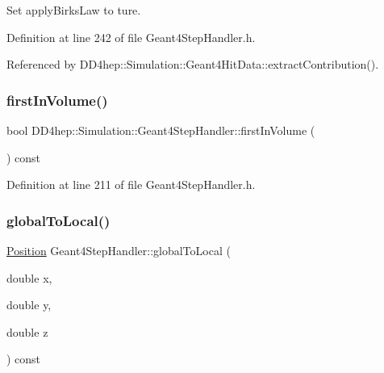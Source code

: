 Set apply\+Birks\+Law to ture. 



Definition at line 242 of file Geant4\+Step\+Handler.\+h.



Referenced by D\+D4hep\+::\+Simulation\+::\+Geant4\+Hit\+Data\+::extract\+Contribution().

\hypertarget{class_d_d4hep_1_1_simulation_1_1_geant4_step_handler_a96df262594297b7030eaac7ed154c622}{}\label{class_d_d4hep_1_1_simulation_1_1_geant4_step_handler_a96df262594297b7030eaac7ed154c622} 
\subsubsection{\texorpdfstring{first\+In\+Volume()}{firstInVolume()}}
{\footnotesize\ttfamily bool D\+D4hep\+::\+Simulation\+::\+Geant4\+Step\+Handler\+::first\+In\+Volume (\begin{DoxyParamCaption}{ }\end{DoxyParamCaption}) const\hspace{0.3cm}{\ttfamily [inline]}}



Definition at line 211 of file Geant4\+Step\+Handler.\+h.

\hypertarget{class_d_d4hep_1_1_simulation_1_1_geant4_step_handler_a95c39168e580011edf1a247a1f2debb0}{}\label{class_d_d4hep_1_1_simulation_1_1_geant4_step_handler_a95c39168e580011edf1a247a1f2debb0} 
\subsubsection{\texorpdfstring{global\+To\+Local()}{globalToLocal()}\hspace{0.1cm}{\footnotesize\ttfamily [1/3]}}
{\footnotesize\ttfamily \hyperlink{namespace_d_d4hep_1_1_geometry_a55083902099d03506c6db01b80404900}{Position} Geant4\+Step\+Handler\+::global\+To\+Local (\begin{DoxyParamCaption}\item[{double}]{x,  }\item[{double}]{y,  }\item[{double}]{z }\end{DoxyParamCaption}) const}



